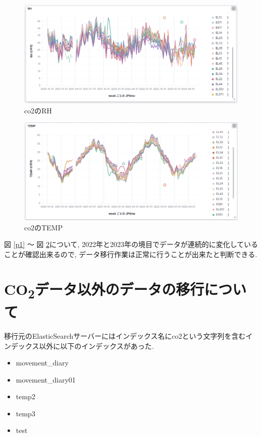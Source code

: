 \documentclass[a4j,12pt,]{jarticle}
\begin{document}
\begin{figure}[H]
  \begin{center}
    \includegraphics[width=160mm]{rh.png}
    \caption{co2のRH}
    \label{p2}
  \end{center}
\end{figure}

\begin{figure}[H]
  \begin{center}
    \includegraphics[width=160mm]{temp.png}
    \caption{co2のTEMP}
    \label{p3}
  \end{center}
\end{figure}

図 \ref{p1} 〜 図 \ref{p3}について, 2022年と2023年の境目でデータが連続的に変化していることが確認出来るので, データ移行作業は正常に行うことが出来たと判断できる.

\section{CO\textsubscript{2}データ以外のデータの移行について}

移行元のElasticSearchサーバーにはインデックス名にco2という文字列を含むインデックス以外に以下のインデックスがあった.

\begin{itemize}
  \item movement\_diary
  \item movement\_diary01
  \item temp2
  \item temp3
  \item test
\end{itemize}
\end{document}
